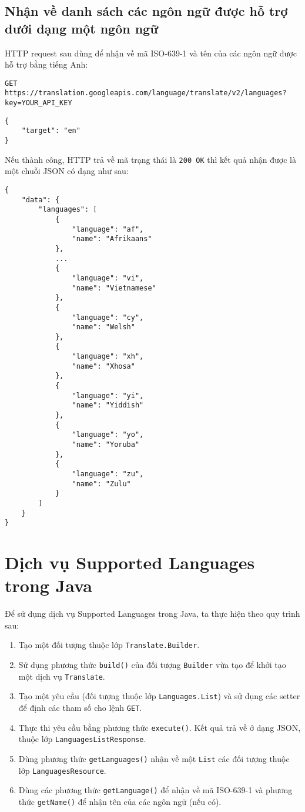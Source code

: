 \documentclass[../thesis.tex]{subfiles}
\begin{document}
\subsection{Nhận về danh sách các ngôn ngữ được hỗ trợ dưới dạng một ngôn ngữ}
HTTP request sau dùng để nhận về mã ISO-639-1 và tên của các ngôn ngữ được hỗ trợ bằng tiếng Anh:
\begin{lstlisting}[style=link]
GET https://translation.googleapis.com/language/translate/v2/languages?key=YOUR_API_KEY
\end{lstlisting}
\begin{lstlisting}[style=link]
{
	"target": "en"
}
\end{lstlisting}

Nếu thành công, HTTP trả về mã trạng thái là \lstinline{200 OK} thì kết quả nhận được là một chuỗi JSON có dạng như sau:

\begin{lstlisting}[style=link]
{
	"data": {
		"languages": [
			{
				"language": "af",
				"name": "Afrikaans"
			},
			...
			{
				"language": "vi",
				"name": "Vietnamese"
			},
			{
				"language": "cy",
				"name": "Welsh"
			},
			{
				"language": "xh",
				"name": "Xhosa"
			},
			{
				"language": "yi",
				"name": "Yiddish"
			},
			{
				"language": "yo",
				"name": "Yoruba"
			},
			{
				"language": "zu",
				"name": "Zulu"
			}
		]
	}
}
\end{lstlisting}

\section{Dịch vụ Supported Languages trong Java}
Để sử dụng dịch vụ Supported Languages trong Java, ta thực hiện theo quy trình sau:
\begin{enumerate}
	\item Tạo một đối tượng thuộc lớp \lstinline{Translate.Builder}.
  	\item Sử dụng phương thức \lstinline{build()} của đối tượng \lstinline{Builder} vừa tạo để khởi tạo một dịch vụ \lstinline{Translate}.
  	\item Tạo một yêu cầu (đối tượng thuộc lớp \lstinline{Languages.List}) và sử dụng các setter để định các tham số cho lệnh \lstinline{GET}.
  	\item Thực thi yêu cầu bằng phương thức \lstinline{execute()}. Kết quả trả về ở dạng JSON, thuộc lớp \lstinline{LanguagesListResponse}.
  	\item Dùng phương thức \lstinline{getLanguages()} nhận về một \lstinline{List} các đối tượng thuộc lớp \lstinline{LanguagesResource}.
  	\item Dùng các phương thức \lstinline{getLanguage()} để nhận về mã ISO-639-1 và phương thức \lstinline{getName()} để nhận tên của các ngôn ngữ (nếu có).
\end{enumerate}


\end{document}
